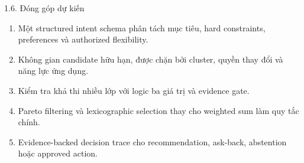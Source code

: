 \begin{frame}[t]{1.6. Đóng góp dự kiến}
\small
\begin{enumerate}
  \item Một structured intent schema phân tách mục tiêu, hard constraints, preferences và authorized flexibility.
  \item Không gian candidate hữu hạn, được chặn bởi cluster, quyền thay đổi và năng lực ứng dụng.
  \item Kiểm tra khả thi nhiều lớp với logic ba giá trị và evidence gate.
  \item Pareto filtering và lexicographic selection thay cho weighted sum làm quy tắc chính.
  \item Evidence-backed decision trace cho recommendation, ask-back, abstention hoặc approved action.
\end{enumerate}
\end{frame}

